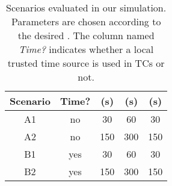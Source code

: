 \begin{table}
\renewcommand{\arraystretch}{1.2}
  \centering
  \begin{tabular}{ | c | c | c | c | c | }
    \hline
    Scenario        & Time? &  \paramtt{} (s)   & \paramteff{} (s)   & \paramtprl{} (s)  \\
    \hline
    \hline
    A1              & no                  & 30                & 60                 & 30                \\
    \hline
    A2              & no                  & 150               & 300                & 150               \\
    \hline
    B1              & yes                 & 30                & 60                 & 30                \\
    \hline
    B2              & yes                 & 150               & 300                & 150               \\
    \hline
  \end{tabular}
  \vspace{0.2cm}
  \caption{ Scenarios evaluated in our simulation. Parameters are chosen
  according to the desired \paramteff{}. The column named \emph{Time?} indicates
  whether a local trusted time source is used in \acp{TC} or not.}
  \label{tbl:eval-scenarios}
\end{table}
%


